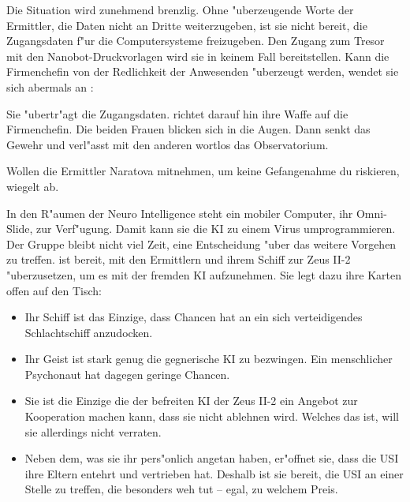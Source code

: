 
Die Situation wird zunehmend brenzlig. Ohne "uberzeugende Worte der Ermittler, die Daten nicht an Dritte weiterzugeben, ist sie nicht bereit, die Zugangsdaten f"ur die Computersysteme freizugeben. Den Zugang zum Tresor mit den Nanobot-Druckvorlagen wird sie in keinem Fall bereitstellen. Kann die Firmenchefin von der Redlichkeit der Anwesenden "uberzeugt werden, wendet sie sich abermals an \ml{}:


Sie "ubertr"agt \ml{} die Zugangsdaten. \xl{} richtet darauf hin ihre Waffe auf die Firmenchefin. Die beiden Frauen blicken sich in die Augen. Dann senkt \xl{} das Gewehr und verl"asst mit den anderen wortlos das Observatorium.

Wollen die Ermittler Naratova mitnehmen, um keine Gefangenahme du riskieren, wiegelt \xl{} ab. 


In den R"aumen der Neuro Intelligence steht \ml{} ein mobiler Computer, ihr Omni-Slide, zur Verf"ugung. Damit kann sie die KI zu einem Virus umprogrammieren. Der Gruppe bleibt nicht viel Zeit, eine Entscheidung "uber das weitere Vorgehen zu treffen. \xl{} ist bereit, mit den Ermittlern und ihrem Schiff zur Zeus II-2 "uberzusetzen, um es mit der fremden KI aufzunehmen. Sie legt dazu ihre Karten offen auf den Tisch:

\begin{itemize}
	\item Ihr Schiff ist das Einzige, dass Chancen hat an ein sich verteidigendes Schlachtschiff anzudocken.
	\item Ihr Geist ist stark genug die gegnerische KI zu bezwingen. Ein menschlicher Psychonaut hat dagegen geringe Chancen.
	\item Sie ist die Einzige die der befreiten KI der Zeus II-2 ein Angebot zur Kooperation machen kann, dass sie nicht ablehnen wird. 
		Welches das ist, will sie allerdings nicht verraten.
    \item Neben dem, was sie ihr pers"onlich angetan haben, er"offnet sie, dass die USI ihre Eltern entehrt und vertrieben hat. Deshalb ist sie bereit, die USI an einer Stelle zu treffen, die besonders weh tut -- egal, zu welchem Preis.
\end{itemize}

